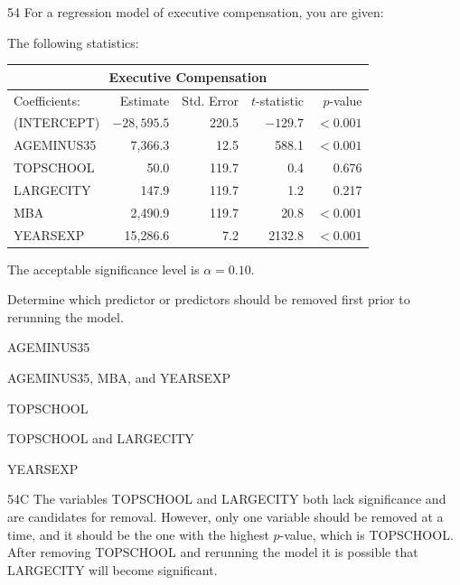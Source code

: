 \begin{question}{54}
For a regression model of executive compensation, you are given:
\begin{given}
\item The following statistics:
\begin{center}
\begin{tabular}{|l|r|r|r|r|}
\hline
\multicolumn{5}{|c|}{Executive Compensation} \\ \hline
Coefficients: & Estimate & Std. Error & $t$-statistic & $p$-value \\ \hline
(INTERCEPT) & $-28{,}595.5$ & 220.5 & $-129.7$ & $<0.001$ \\ \hline
AGEMINUS35 & 7,366.3 & 12.5 & 588.1 & $<0.001$ \\ \hline
TOPSCHOOL & 50.0 & 119.7 & 0.4 & 0.676 \\ \hline
LARGECITY & 147.9 & 119.7 & 1.2 & 0.217 \\ \hline
MBA & 2,490.9 & 119.7 & 20.8 & $<0.001$ \\ \hline
YEARSEXP & 15,286.6 & 7.2 & 2132.8 & $<0.001$ \\ \hline
\end{tabular}
\end{center}
\item The acceptable significance level is $\alpha = 0.10$.
\end{given}

Determine which predictor or predictors should be removed first prior to rerunning the model.

\begin{choices}
\item AGEMINUS35
\item AGEMINUS35, MBA, and YEARSEXP
\item TOPSCHOOL
\item TOPSCHOOL and LARGECITY
\item YEARSEXP
\end{choices}
\end{question}
\begin{solution}{54}{C}
The variables TOPSCHOOL and LARGECITY both lack significance and are candidates for removal. However, only one variable should be removed at a time, and it should be the one with the highest $p$-value, which is TOPSCHOOL. After removing TOPSCHOOL and rerunning the model it is possible that LARGECITY will become significant.
\end{solution}

